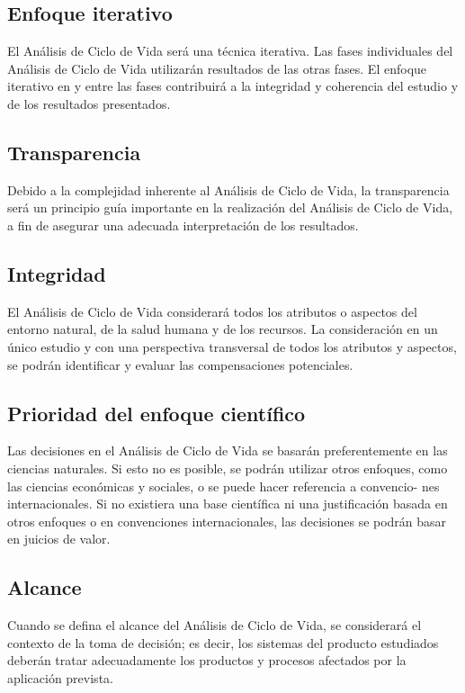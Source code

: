 \subsection{Enfoque iterativo}
El Análisis de Ciclo de Vida será una técnica iterativa. Las fases individuales del Análisis de Ciclo de Vida utilizarán resultados de las otras fases. El enfoque iterativo en y entre las fases contribuirá a la integridad y coherencia del estudio y de los resultados presentados.

\subsection{Transparencia}
Debido a la complejidad inherente al Análisis de Ciclo de Vida, la transparencia será un principio guía importante en la realización del Análisis de Ciclo de Vida, a fin de asegurar una adecuada interpretación de los resultados.

\subsection{Integridad}
El Análisis de Ciclo de Vida considerará todos los atributos o aspectos del entorno natural, de la salud humana y de los recursos. La consideración en un único estudio y con una perspectiva transversal de todos los atributos y aspectos, se podrán identificar y evaluar las compensaciones potenciales.

\subsection{Prioridad del enfoque científico}
Las decisiones en el Análisis de Ciclo de Vida se basarán preferentemente en las ciencias naturales. Si esto no es posible, se podrán utilizar otros enfoques, como las ciencias económicas y sociales, o se puede hacer referencia a convencio- nes internacionales. Si no existiera una base científica ni una justificación basada en otros enfoques o en convenciones internacionales, las decisiones se podrán basar en juicios de valor.

\subsection{Alcance}
Cuando se defina el alcance del Análisis de Ciclo de Vida, se considerará el contexto de la toma de decisión; es decir, los sistemas del producto estudiados deberán tratar adecuadamente los productos y procesos afectados por la aplicación prevista.

